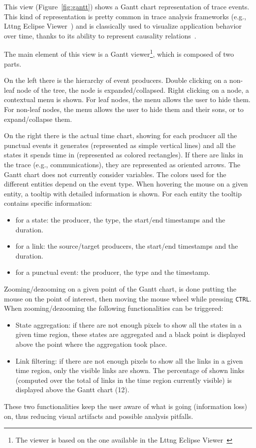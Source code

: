 \documentclass[twoside]{article}
\begin{document}
\begin{sloppypar}
This view (Figure~\ref{fig:gantt}) shows a Gantt chart representation of trace events.
This kind of representation is pretty common in trace analysis frameworks (e.g., Lttng Eclipse Viewer~\cite{lttng_viewer}) and is classically used to visualize application behavior over time, thanks to its ability to represent causality relations~\cite{wilson_gantt_2003}.

The main element of this view is a Gantt viewer\footnote{The viewer is based on the one available in the Lttng Eclipse Viewer~\cite{lttng_viewer}}, which is composed of two parts.

On the left there is the hierarchy of event producers. 
Double clicking on a non-leaf node of the tree, the node is expanded/collapsed.
Right clicking on a node, a contextual menu is shown. 
For leaf nodes, the menu allows the user to hide them.
For non-leaf nodes, the menu allows the user to hide them and their sons, or to expand/collapse them.

On the right there is the actual time chart, showing for each producer all the punctual events it generates (represented as simple vertical lines) and all the states it spends time in (represented as colored rectangles). 
If there are links in the trace (e.g., communications), they are represented as oriented arrows.
The Gantt chart does not currently consider variables.
The colors used for the different entities depend on the event type.
When hovering the mouse on a given entity, a tooltip with detailed information is shown.
For each entity the tooltip contains specific information:
\begin{itemize}
 \item for a state: the producer, the type, the start/end timestamps and the duration.
 \item for a link: the source/target producers, the start/end timestamps and the duration.
 \item for a punctual event: the producer, the type and the timestamp.
\end{itemize}

Zooming/dezooming on a given point of the Gantt chart, is done putting the mouse on the point of interest, then moving the mouse wheel while pressing \texttt{CTRL}.
When zooming/dezooming the following functionalities can be triggered:
\begin{itemize}
 \item State aggregation: if there are not enough pixels to show all the states in a given time region, these states are aggregated and a black point is displayed above the point where the aggregation took place. 
 \item Link filtering: if there are not enough pixels to show all the links in a given time region, only the visible links are shown. 
 The percentage of shown links (computed over the total of links in the time region currently visible) is displayed above the Gantt chart (\num{12}).
\end{itemize}
These two functionalities keep the user aware of what is going (information loss) on, thus reducing visual artifacts and possible analysis pitfalls.


\end{sloppypar}
\end{document}
